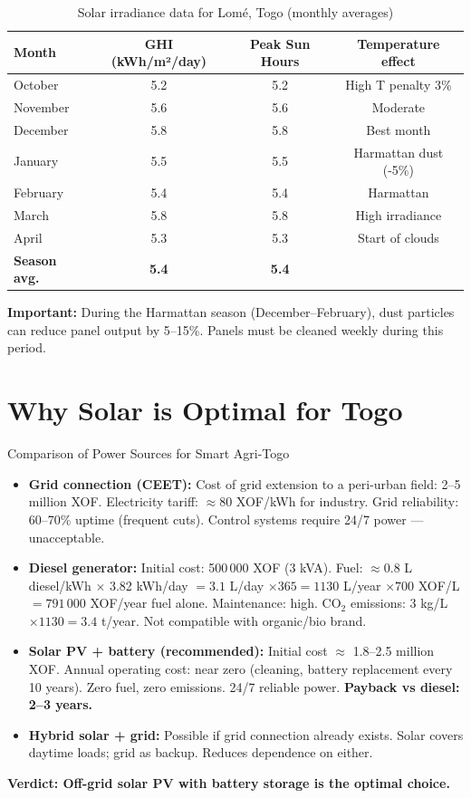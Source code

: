 \documentclass[12pt,a4paper,openany]{book}
\begin{document}
\begin{table}[H]
\centering
\caption{Solar irradiance data for Lomé, Togo (monthly averages)}
\renewcommand{\arraystretch}{1.3}
\begin{tabular}{lccc}
\toprule
\textbf{Month}&\textbf{GHI (kWh/m²/day)}&\textbf{Peak Sun Hours}&\textbf{Temperature effect}\\
\midrule
October  & 5.2 & 5.2 & High T penalty 3\%\\
November & 5.6 & 5.6 & Moderate\\
December & 5.8 & 5.8 & Best month\\
January  & 5.5 & 5.5 & Harmattan dust (-5\%)\\
February & 5.4 & 5.4 & Harmattan\\
March    & 5.8 & 5.8 & High irradiance\\
April    & 5.3 & 5.3 & Start of clouds\\
\midrule
\textbf{Season avg.} & \textbf{5.4} & \textbf{5.4} & \\
\bottomrule
\end{tabular}
\end{table}

\textbf{Important:} During the Harmattan season (December--February), dust particles can reduce panel output by 5--15\%. Panels must be cleaned weekly during this period.

\section{Why Solar is Optimal for Togo}

\begin{energybox}{Comparison of Power Sources for Smart Agri-Togo}
\begin{itemize}[leftmargin=1.5em]
  \item \textbf{Grid connection (CEET):} Cost of grid extension to a peri-urban field: 2--5 million XOF. Electricity tariff: $\approx80$ XOF/kWh for industry. Grid reliability: 60--70\% uptime (frequent cuts). Control systems require 24/7 power — unacceptable.
  \item \textbf{Diesel generator:} Initial cost: 500\,000 XOF (3 kVA). Fuel: $\approx0.8$ L diesel/kWh $\times$ 3.82 kWh/day $=3.1$ L/day $\times365=1130$ L/year $\times700$ XOF/L $=791\,000$ XOF/year fuel alone. Maintenance: high. CO$_2$ emissions: 3 kg/L $\times1130=3.4$ t/year. Not compatible with organic/bio brand.
  \item \textbf{Solar PV + battery (recommended):} Initial cost $\approx$ 1.8--2.5 million XOF. Annual operating cost: near zero (cleaning, battery replacement every 10 years). Zero fuel, zero emissions. 24/7 reliable power. \textbf{Payback vs diesel: 2--3 years.}
  \item \textbf{Hybrid solar + grid:} Possible if grid connection already exists. Solar covers daytime loads; grid as backup. Reduces dependence on either.
\end{itemize}
\textbf{Verdict: Off-grid solar PV with battery storage is the optimal choice.}
\end{energybox}
\end{document}
